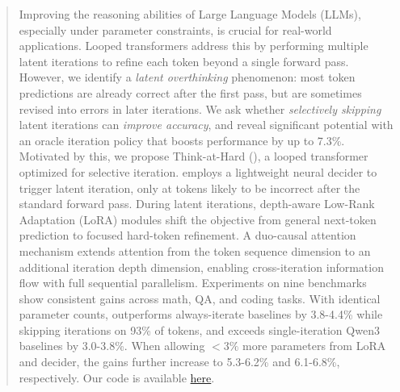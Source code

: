\begin{abstract}
\label{sec:abstract}
Improving the reasoning abilities of Large Language Models (LLMs), especially under parameter constraints, is crucial for real-world applications.
Looped transformers address this by performing multiple latent iterations to refine each token beyond a single forward pass.
However, we identify a \emph{latent overthinking} phenomenon: most token predictions are already correct after the first pass, but are sometimes revised into errors in later iterations.
We ask whether \emph{selectively skipping} latent iterations can \emph{improve accuracy}, and reveal significant potential with an oracle iteration policy that boosts performance by up to 7.3\%.
Motivated by this, we propose Think-at-Hard (\name), a looped transformer optimized for selective iteration.
\name employs a lightweight neural decider to trigger latent iteration, only at tokens likely to be incorrect after the standard forward pass.
During latent iterations, depth-aware Low-Rank Adaptation (LoRA) modules shift the objective from general next-token prediction to focused hard-token refinement.
A duo-causal attention mechanism extends attention from the token sequence dimension to an additional iteration depth dimension, enabling cross-iteration information flow with full sequential parallelism.
Experiments on nine benchmarks show consistent gains across math, QA, and coding tasks.
With identical parameter counts, \name outperforms always-iterate baselines by 3.8-4.4\% while skipping iterations on 93\% of tokens, and exceeds single-iteration Qwen3 baselines by 3.0-3.8\%.
When allowing $<3\%$ more parameters from LoRA and decider, the gains further increase to 5.3-6.2\% and 6.1-6.8\%, respectively.
Our code is available \href{https://github.com/thu-nics/TaH}{here}.
\end{abstract}
